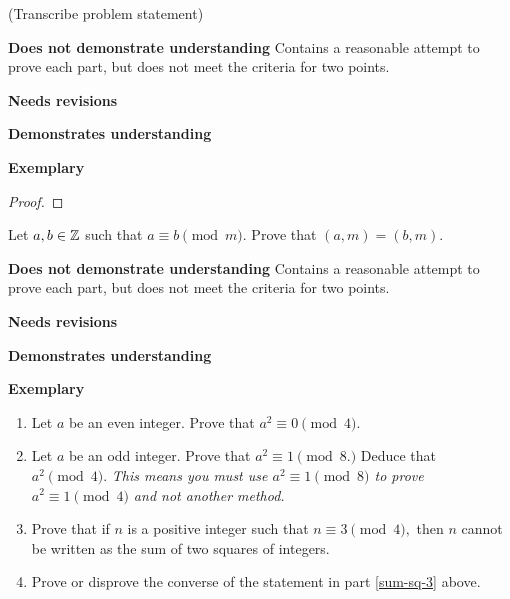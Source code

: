 \documentclass[letterpaper, 11pt]{../ximera}
\begin{document}
\begin{ex}
 (Transcribe problem statement)
\end{ex}

\begin{writeRubric}
    \item \textbf{Does not demonstrate understanding}
     Contains a reasonable attempt to prove each part, but does not meet the criteria for two points.
    \item \textbf{Needs revisions}
     
    \item \textbf{Demonstrates understanding}
    
    \item \textbf{Exemplary}
        
\end{writeRubric}
                                       \begin{proof}
 
\end{proof}

\begin{ex}
 Let $a,b\in\mathbb Z$ such that $a\equiv b\pmod{m}.$ Prove that $(a,m)=(b,m).$
\end{ex}

\begin{writeRubric}
    \item \textbf{Does not demonstrate understanding}
     Contains a reasonable attempt to prove each part, but does not meet the criteria for two points.
    \item \textbf{Needs revisions}
     
    \item \textbf{Demonstrates understanding}
    
    \item \textbf{Exemplary}
        
\end{writeRubric}
                                       
\begin{ex}
  	\begin{enumerate}[label=(\alph*)] 
		\item Let $a$ be an even integer. Prove that $a^2\equiv 0\pmod{4}.$

		\item Let $a$ be an odd integer. Prove that $a^2\equiv 1\pmod{8.}$ Deduce that $a^2\pmod{4}.$ \emph{This means you must use $a^2\equiv 1\pmod{8}$ to prove $a^2\equiv1\pmod{4}$ and not another method.}
		
		\item\label{sum-sq-3} Prove that if $n$ is a positive integer such that $n\equiv 3\pmod 4,$ then $n$ cannot be written as the sum of two squares of integers.
		
		\item Prove or disprove the converse of the statement in part \ref{sum-sq-3} above.
	\end{enumerate}
\end{ex}
\end{document}

